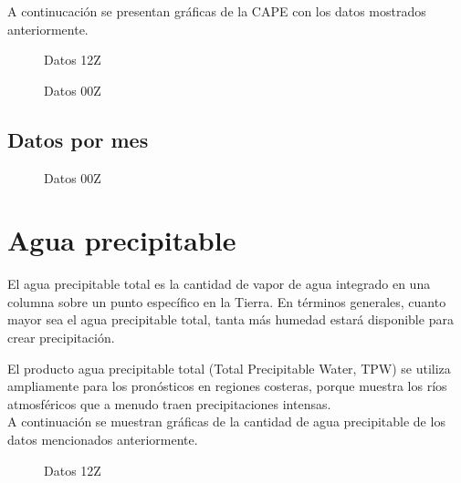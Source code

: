 \documentclass[12pt]{article}
\begin{document}
 A continucación se presentan gráficas de la CAPE con los datos mostrados anteriormente.
 
 
\begin{figure}[H]
 \centering
    \caption{Datos 12Z}
\end{figure}
 
\begin{figure}[H]
 \centering
    \caption{Datos 00Z}
\end{figure}
  
\subsection*{Datos por mes}
 
 
 \begin{figure}[H]
 \centering
    \caption{Datos 00Z}
\end{figure}
  
 
 
 
 
 
\newpage

\section*{Agua precipitable}
El agua precipitable total es la cantidad de vapor de agua integrado en una columna sobre un punto específico en la Tierra. En términos generales, cuanto mayor sea el agua precipitable total, tanta más humedad estará disponible para crear precipitación.

El producto agua precipitable total (Total Precipitable Water, TPW) se utiliza ampliamente para los pronósticos en regiones costeras, porque muestra los ríos atmosféricos que a menudo traen precipitaciones intensas. \\
A continuación se muestran gráficas de la cantidad de agua precipitable de los datos mencionados anteriormente.

 
\begin{figure}[H]
 \centering
    \caption{Datos 12Z}
\end{figure}
\end{document}
